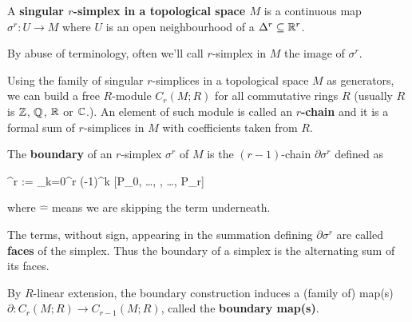 \begin{figure}[H]
	\centering
\end{figure}

\begin{definition}
	A \textbf{singular $r$-simplex in a topological space $M$} is a continuous map $\sigma^r : U \to M$ where $U$ is an open neighbourhood of a $\Delta^r \subseteq \mathbb{R}^r$.
\end{definition}

By abuse of terminology, often we'll call $r$-simplex in $M$ the image of $\sigma^r$.

\begin{construction}
	Using the family of singular $r$-simplices in a topological space $M$ as generators, we can build a free $R$-module $C_r(M; R)$ for all commutative rings $R$ (usually $R$ is $\mathbb{Z}$, $\mathbb{Q}$, $\mathbb{R}$ or $\mathbb{C}$.). An element of such module is called an \textbf{$r$-chain} and it is a formal sum of $r$-simplices in $M$ with coefficients taken from $R$.
\end{construction}

\begin{definition}
	The \textbf{boundary} of an $r$-simplex $\sigma^r$ of $M$ is the $(r-1)$-chain $\partial \sigma^r$ defined as
	\begin{eqalign}
		\partial \sigma^r := \sum_{k=0}^r (-1)^k [P_0, \ldots, , \ldots, P_r]
	\end{eqalign}
	where $\hat{-}$ means we are skipping the term underneath.
\end{definition}

The terms, without sign, appearing in the summation defining $\partial \sigma^r$ are called \textbf{faces} of the simplex. Thus the boundary of a simplex is the alternating sum of its faces.

By $R$-linear extension, the boundary construction induces a (family of) map(s) $\partial : C_r(M; R) \to C_{r-1}(M; R)$, called the \textbf{boundary map(s)}.

